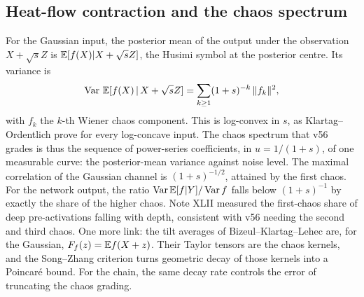 \subsection{Heat-flow contraction and the chaos spectrum}
For the Gaussian input, the posterior mean of the output under the observation $X+\sqrt sZ$ is $\mathbb E[f(X)|X+\sqrt sZ]$, the Husimi symbol
at the posterior centre. Its variance is
\[
\operatorname{Var}\,\mathbb E[f(X)\,|\,X+\sqrt sZ]=\sum_{k\ge1}(1+s)^{-k}\,\|f_k\|^2,
\]
with $f_k$ the $k$-th Wiener chaos component. This is log-convex in $s$, as Klartag--Ordentlich prove for every log-concave input. The
chaos spectrum that v56 grades is thus the sequence of power-series coefficients, in $u=1/(1+s)$, of one measurable curve: the
posterior-mean variance against noise level. The maximal correlation of the Gaussian channel is $(1+s)^{-1/2}$, attained by the first chaos. For the network output, the ratio
$\operatorname{Var}\mathbb E[f|Y]/\operatorname{Var} f$ falls below $(1+s)^{-1}$ by exactly the share of the higher chaos. Note XLII measured the first-chaos share of
deep pre-activations falling with depth, consistent with v56 needing the second and third chaos. One more link: the tilt averages of Bizeul--Klartag--Lehec
are, for the Gaussian, $F_f(z)=\mathbb E f(X+z)$. Their Taylor tensors are the chaos kernels, and the Song--Zhang criterion turns geometric
decay of those kernels into a Poincar\'e bound. For the chain, the same decay rate controls the error of truncating the chaos grading.
